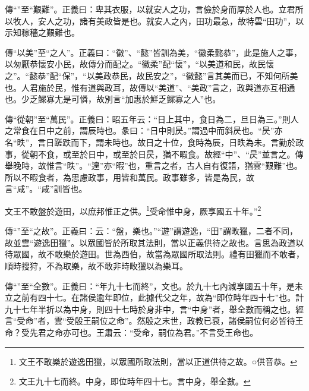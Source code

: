 {\noindent\zhuan{}\fzbyks 傳“”至“艱難”。正義曰：卑其衣服，以就安人之功，言儉於身而厚於人也。立君所以牧人，安人之功，諸有美政皆是也。就安人之內，田功最急，故特雲“田功”，以示知稼穡之艱難也。 \par}

{\noindent\zhuan{}\fzbyks 傳“以美”至“之人”。正義曰：“徽”、“懿”皆訓為美，“徽柔懿恭”，此是施人之事，以匆厭恭懷安小民，故傳分而配之。“徽柔”配“懷”，“以美道和民，故民懷之”。“懿恭”配“保”，“以美政恭民，故民安之”，“徽懿”言其美而已，不知何所美也。人君施於民，惟有道與政耳，故傳以“美道”、“美政”言之，政與道亦互相通也。少乏鰥寡尢是可憐，故別言“加惠於鮮乏鰥寡之人”也。 \par}

{\noindent\zhuan{}\fzbyks 傳“從朝”至“萬民”。正義曰：昭五年云：“日上其中，食日為二，旦日為三。”則人之常食在日中之前，謂辰時也。彖曰：“日中則昃。”謂過中而斜昃也。“昃”亦名“昳”，言日蹉跌而下，謂未時也。故日之十位，食時為辰，日昳為未。言勤於政事，從朝不食，或至於日中，或至於日昃，猶不暇食。故經“中”、“昃”並言之。傳舉晚時，故惟言“昳”。“遑”亦“暇”也，重言之者，古人自有復語，猶雲“艱難”也。所以不暇食者，為思慮政事，用皆和萬民。政事雖多，皆是為民，故言“咸”。“咸”訓皆也。 \par}

文王不敢盤於遊田，以庶邦惟正之供。\footnote{文王不敢樂於遊逸田獵，以眾國所取法則，當以正道供待之故。○供音恭。}受命惟中身，厥享國五十年。”\footnote{文王九十七而終。中身，即位時年四十七。言中身，舉全數。}

{\noindent\zhuan{}\fzbyks 傳“”至“之故”。正義曰：云：“盤，樂也。”“遊”謂遊逸，“田”謂畋獵，二者不同，故並雲“遊逸田獵”。以眾國皆於所取其法則，當以正義供待之故也。言思為政道以待眾國，故不敢樂於遊田。世為西伯，故當為眾國所取法則。禮有田獵而不敢者，順時搜狩，不為取樂，故不敢非時畋獵以為樂耳。 \par}

{\noindent\zhuan{}\fzbyks 傳“”至“全數”。正義曰：“年九十七而終”，文也。於九十七內減享國五十年，是未立之前有四十七。在諸侯逾年即位，此據代父之年，故為“即位時年四十七”也。計九十七年半折以為中身，則四十七時於身非中，言“中身”者，舉全數而稱之也。經言“受命”者，雲“受殷王嗣位之命”。然殷之末世，政教已衰，諸侯嗣位何必皆待王命？受先君之命亦可也。王肅云：“受命，嗣位為君。”不言受王命也。 \par}

